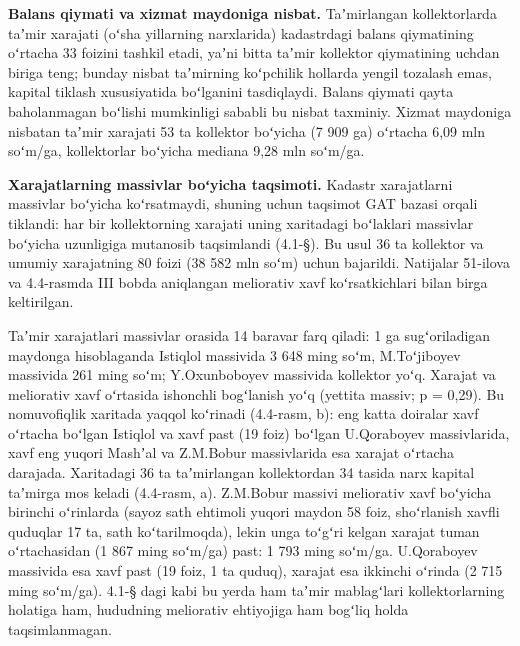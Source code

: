 \textbf{Balans qiymati va xizmat maydoniga nisbat.} Taʼmirlangan
kollektorlarda taʼmir xarajati (oʻsha yillarning narxlarida) kadastrdagi
balans qiymatining oʻrtacha 33 foizini tashkil etadi, yaʼni bitta taʼmir
kollektor qiymatining uchdan biriga teng; bunday nisbat taʼmirning
koʻpchilik hollarda yengil tozalash emas, kapital tiklash xususiyatida
boʻlganini tasdiqlaydi. Balans qiymati qayta baholanmagan boʻlishi
mumkinligi sababli bu nisbat taxminiy. Xizmat maydoniga nisbatan taʼmir
xarajati 53 ta kollektor boʻyicha (7 909 ga) oʻrtacha 6,09 mln soʻm/ga,
kollektorlar boʻyicha mediana 9,28 mln soʻm/ga.

\textbf{Xarajatlarning massivlar boʻyicha taqsimoti.} Kadastr
xarajatlarni massivlar boʻyicha koʻrsatmaydi, shuning uchun taqsimot GAT
bazasi orqali tiklandi: har bir kollektorning xarajati uning xaritadagi
boʻlaklari massivlar boʻyicha uzunligiga mutanosib taqsimlandi (4.1-§).
Bu usul 36 ta kollektor va umumiy xarajatning 80 foizi (38 582 mln soʻm)
uchun bajarildi. Natijalar 51-ilova va 4.4-rasmda III bobda aniqlangan
meliorativ xavf koʻrsatkichlari bilan birga keltirilgan.



Taʼmir xarajatlari massivlar orasida 14 baravar farq qiladi: 1 ga
sugʻoriladigan maydonga hisoblaganda Istiqlol massivida 3 648 ming soʻm,
M.Toʻjiboyev massivida 261 ming soʻm; Y.Oxunboboyev massivida kollektor
yoʻq. Xarajat va meliorativ xavf oʻrtasida ishonchli bogʻlanish yoʻq
(yettita massiv; p = 0,29). Bu nomuvofiqlik xaritada yaqqol koʻrinadi
(4.4-rasm, b): eng katta doiralar xavf oʻrtacha boʻlgan Istiqlol va xavf
past (19 foiz) boʻlgan U.Qoraboyev massivlarida, xavf eng yuqori Mashʼal
va Z.M.Bobur massivlarida esa xarajat oʻrtacha darajada. Xaritadagi 36
ta taʼmirlangan kollektordan 34 tasida narx kapital taʼmirga mos keladi
(4.4-rasm, a). Z.M.Bobur massivi meliorativ xavf boʻyicha birinchi
oʻrinlarda (sayoz sath ehtimoli yuqori maydon 58 foiz, shoʻrlanish
xavfli quduqlar 17 ta, sath koʻtarilmoqda), lekin unga toʻgʻri kelgan
xarajat tuman oʻrtachasidan (1 867 ming soʻm/ga) past: 1 793 ming
soʻm/ga. U.Qoraboyev massivida esa xavf past (19 foiz, 1 ta quduq),
xarajat esa ikkinchi oʻrinda (2 715 ming soʻm/ga). 4.1-§ dagi kabi bu
yerda ham taʼmir mablagʻlari kollektorlarning holatiga ham, hududning
meliorativ ehtiyojiga ham bogʻliq holda taqsimlanmagan.

